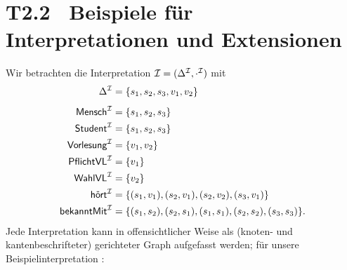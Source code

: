 \documentclass[fontsize=11pt, twoside=false, numbers=autoenddot]{scrbook}
\begin{document}
\section*{T2.2~ Beispiele für Interpretationen und Extensionen}

Wir betrachten die Interpretation $\mathcal{I} = (\Delta^\mathcal{I},\cdot^\mathcal{I})$ mit
%
\begin{align*}
  \Delta^\mathcal{I}            & = \{s_1,s_2,s_3,v_1,v_2\} \\[4pt]
  \textsf{Mensch}^\mathcal{I}     & = \{s_1,s_2,s_3\}         \\
  \textsf{Student}^\mathcal{I}    & = \{s_1,s_2,s_3\}         \\
  \textsf{Vorlesung}^\mathcal{I}  & = \{v_1,v_2\}             \\
  \textsf{PflichtVL}^\mathcal{I}  & = \{v_1\}                 \\
  \textsf{WahlVL}^\mathcal{I}     & = \{v_2\}                 \\
  \textsf{hört}^\mathcal{I}       & = \{(s_1,v_1),(s_2,v_1),(s_2,v_2),(s_3,v_1)\} \\
  \textsf{bekanntMit}^\mathcal{I} & = \{(s_1,s_2),(s_2,s_1),(s_1,s_1),(s_2,s_2),(s_3,s_3)\}.
\end{align*}
%
Jede Interpretation kann in offensichtlicher Weise als (knoten- und kantenbeschrifteter)
gerichteter Graph aufgefasst werden; für unsere Beispielinterpretation \Imc:
%
\end{document}
